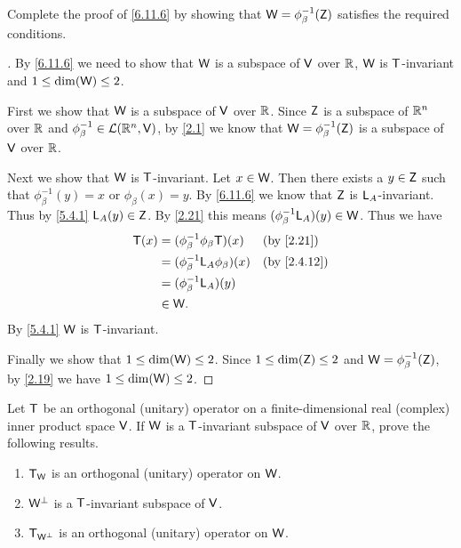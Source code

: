 \begin{ex}\label{ex:6.11.13}
  Complete the proof of \cref{6.11.6} by showing that \(\mathsf{W} = \phi_{\beta}^{-1}(\mathsf{Z})\) satisfies the required conditions.
\end{ex}

\begin{proof}[]
  By \cref{6.11.6} we need to show that \(\mathsf{W}\) is a subspace of \(\mathsf{V}\) over \(\mathbb{R}\), \(\mathsf{W}\) is \(\mathsf{T}\)-invariant and \(1 \leq \dim(\mathsf{W}) \leq 2\).

  First we show that \(\mathsf{W}\) is a subspace of \(\mathsf{V}\) over \(\mathbb{R}\).
  Since \(\mathsf{Z}\) is a subspace of \(\mathbb{R}^n\) over \(\mathbb{R}\) and \(\phi_{\beta}^{-1} \in \mathcal{L}(\mathbb{R}^n, \mathsf{V})\), by \cref{2.1} we know that \(\mathsf{W} = \phi_{\beta}^{-1}(\mathsf{Z})\) is a subspace of \(\mathsf{V}\) over \(\mathbb{R}\).

  Next we show that \(\mathsf{W}\) is \(\mathsf{T}\)-invariant.
  Let \(x \in \mathsf{W}\).
  Then there exists a \(y \in \mathsf{Z}\) such that \(\phi_{\beta}^{-1}(y) = x\) or \(\phi_{\beta}(x) = y\).
  By \cref{6.11.6} we know that \(\mathsf{Z}\) is \(\mathsf{L}_A\)-invariant.
  Thus by \cref{5.4.1} \(\mathsf{L}_A(y) \in \mathsf{Z}\).
  By \cref{2.21} this means \((\phi_{\beta}^{-1} \mathsf{L}_A)(y) \in \mathsf{W}\).
  Thus we have
  \begin{align*}
    \T(x) & = (\phi_{\beta}^{-1} \phi_{\beta} \T)(x)   &  & \by{2.21}   \\
          & = (\phi_{\beta}^{-1} \L_A \phi_{\beta})(x) &  & \by{2.4.12} \\
          & = (\phi_{\beta}^{-1} \L_A)(y)                               \\
          & \in \W.
  \end{align*}
  By \cref{5.4.1} \(\mathsf{W}\) is \(\mathsf{T}\)-invariant.

  Finally we show that \(1 \leq \dim(\mathsf{W}) \leq 2\).
  Since \(1 \leq \dim(\mathsf{Z}) \leq 2\) and \(\mathsf{W} = \phi_{\beta}^{-1}(\mathsf{Z})\), by \cref{2.19} we have \(1 \leq \dim(\mathsf{W}) \leq 2\).
\end{proof}

\begin{ex}\label{ex:6.11.14}
  Let \(\mathsf{T}\) be an orthogonal (unitary) operator on a finite-dimensional real (complex) inner product space \(\mathsf{V}\).
  If \(\mathsf{W}\) is a \(\mathsf{T}\)-invariant subspace of \(\mathsf{V}\) over \(\mathbb{R}\), prove the following results.
  \begin{enumerate}
    \item \(\mathsf{T}_{\mathsf{W}}\) is an orthogonal (unitary) operator on \(\mathsf{W}\).
    \item \(\mathsf{W}^{\perp}\) is a \(\mathsf{T}\)-invariant subspace of \(\mathsf{V}\).
    \item \(\mathsf{T}_{\mathsf{W}^{\perp}}\) is an orthogonal (unitary) operator on \(\mathsf{W}\).
  \end{enumerate}
\end{ex}

